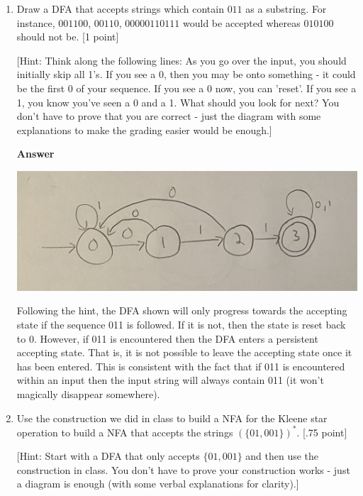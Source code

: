\documentclass[11pt]{article}
\newcommand \kw[1]{\textbf{#1}}
\newenvironment{answer}{
\vspace{.5cm}
\kw{Answer} 

}
{
\pagebreak
}
\begin{document}
\begin{enumerate}
\item Draw a DFA that accepts strings which contain $011$ as a substring. For instance, $001100$, $00110$, $00000110111$ would be accepted whereas $010100$ should not be. [1 point]

[Hint: Think along the following lines: As you go over the input, you should initially skip all 1's. If you see a 0, then you may be onto something - it could be the first 0 of your sequence. If you see a 0 now, you can 'reset'. If you see a 1, you know you've seen a 0 and a 1. What should you look for next? You don't have to prove that you are correct - just the diagram with some explanations to make the grading easier would be enough.]

\begin{answer}
    \includegraphics[scale=.2]{dfa-3.jpg}

    Following the hint, the DFA shown will only progress towards the accepting state if the sequence 011 is followed. If it is not, then the state is reset back to 0. However, if 011 is encountered then the DFA enters a persistent accepting state. That is, it is not possible to leave the accepting state once it has been entered. This is consistent with the fact that if 011 is encountered within an input then the input string will always contain 011 (it won't magically disappear somewhere).
\end{answer}

\item Use the construction we did in class to build a NFA for the Kleene star operation to build a NFA that accepts the strings $(\{01, 001\})^*$. [.75 point]

[Hint: Start with a DFA that only accepts $\{01, 001\}$ and then use the construction in class. You don't have to prove your construction works - just a diagram is enough (with some verbal explanations for clarity).]


\end{enumerate}
\end{document}
